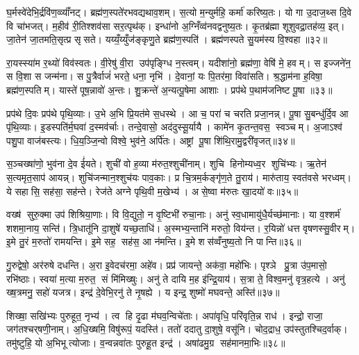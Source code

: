 घ॒र्मस्वे॑देभि॒र्द्रवि॑ण॒व्व्याँ॑नट्। ब्रह्म॑ण॒स्पते॑रभवद्यथाव॒शम्। स॒त्यो म॒न्युर्महि॒ कर्मा॑ करिष्य॒तः। यो गा उ॒दाज॒थ्स दि॒वे वि चा॑भजत्। म॒हीव॑ री॒तिश्शव॑सा सर॒त्पृथ॑क्। इन्धा॑नो अ॒ग्निँव्व॑नवद्वनुष्य॒तः। कृ॒तब्र॑ह्मा शूशुवद्रा॒तह॑व्य॒ इत्। जा॒तेन॑ जा॒तमति॒सृत्प्र सृसते। यय्यँ॒य्युँज॑ङ्कृणु॒ते ब्रह्म॑ण॒स्पति॑। ब्रह्म॑णस्पते सु॒यम॑स्य वि॒श्वहा॥३२॥

रा॒यस्स्या॑म र॒थ्यो॑ विव॑स्वतः। वी॒रेषु॑ वी॒रा उप॑पृङ्ग्धि न॒स्त्वम्। यदीशा॑नो॒ ब्रह्म॑णा॒ वेषि॑ मे॒ हवम्। स इज्जने॑न॒ स वि॒शा स जन्म॑ना। स पु॒त्रैर्वाजं॑ भरते॒ धना॒ नृभि॑। दे॒वानां॒ यः पि॒तर॑मा॒ विवा॑सति। श्र॒द्धाम॑ना ह॒विषा॒ ब्रह्म॑ण॒स्पतिम्। यास्ते॑ पूष॒न्नावो॑ अ॒न्तः। शु॒क्रन्ते॑ अ॒न्यत्पू॒षेमा आशाः। प्रप॑थे प॒थाम॑जनिष्ट पू॒षा ॥३३॥

प्रप॑थे दि॒वः प्रप॑थे पृथि॒व्याः। उ॒भे अ॒भि प्रि॒यत॑मे स॒धस्थे। आ च॒ परा॑ च चरति प्रजा॒नन्न्। पू॒षा सु॒बन्धु॑र्दि॒व आ पृ॑थि॒व्याः। इ॒डस्पति॑र्म॒घवा॑ द॒स्मव॑र्चाः। तन्दे॒वासो॒ अद॑दुस्सू॒र्यायै। कामे॑न कृ॒तन्त॒वस॒ स्वञ्चम्। अ॒जाऽश्व॑ पशु॒पा वाज॑बस्त्यः। धि॒य॒ञ्जि॒न्वो विश्वे॒ भुव॑ने॒ अर्पि॑तः। अष्ट्रां पू॒षा शि॑थि॒रामु॒द्वरी॑वृजत्॥३४॥

स॒ञ्चख्षा॑णो॒ भुव॑ना दे॒व ई॑यते। शुची॑ वो ह॒व्या म॑रुत॒श्शुची॑नाम्। शुचि हिनोम्यध्व॒र शुचि॑भ्यः। ऋ॒तेन॑ स॒त्यमृत॒साप॑ आयन्न्। शुचि॑जन्मान॒श्शुच॑यः पाव॒काः। प्र चि॒त्रम॒र्कङ्गृ॑ण॒ते तु॒राय॑। मारु॑ताय॒ स्वत॑वसे भरध्वम्। ये सहासि॒ सह॑सा॒ सह॑न्ते। रेज॑ते अग्ने पृथि॒वी म॒खेभ्य॑। असे॒ष्वा म॑रुतः खा॒दयो॑ वः॥३५॥

वख्ष॑ सुरु॒क्मा उप॑ शिश्रिया॒णाः। वि वि॒द्युतो॒ न वृ॒ष्टिभी॑ रुचा॒नाः। अनु॑ स्व॒धामायु॑धै॒र्यच्छ॑मानाः। या व॒श्शर्म॑ शशमा॒नाय॒ सन्ति॑। त्रि॒धातू॑नि दा॒शुषे॑ यच्छ॒ताधि॑। अ॒स्मभ्य॒न्तानि॑ मरुतो॒ विय॑न्त। र॒यिन्नो॑ धत्त वृषणस्सु॒वीरम्। इ॒मे तु॒रं म॒रुतो॑ रामयन्ति। इ॒मे सह॒ सह॑स॒ आ न॑मन्ति। इ॒मे शस॑व्वँनुष्य॒तो नि पान्ति॥३६॥

गु॒रुद्वेषो॒ अर॑रुषे दधन्ति। अ॒रा इ॒वेदच॑रमा॒ अहे॑व। प्रप्र॑ जायन्ते॒ अक॑वा॒ महो॑भिः। पृश्ञे प्रु॒त्रा उ॑प॒मासो॒ रभि॑ष्ठाः। स्वया॑ म॒त्या म॒रुत॒ सं मि॑मिख्षुः। अनु॑ ते दायि म॒ह इ॑न्द्रि॒याय॑। स॒त्रा ते॒ विश्व॒मनु॑ वृत्र॒हत्ये। अनु॑ ख्ष॒त्रमनु॒ सहो॑ यजत्र। इन्द्र॑ दे॒वेभि॒रनु॑ ते नृ॒षह्ये। य इन्द्र॒ शुष्मो॑ मघवन्ते॒ अस्ति॑॥३७॥

शिख्षा॒ सखि॑भ्यः पुरुहूत॒ नृभ्य॑। त्व हि दृ॒ढा म॑घव॒न्विचे॑ताः। अपा॑वृधि॒ परि॑वृति॒न्न राध॑। इन्द्रो॒ राजा॒ जग॑तश्चर्‌षणी॒नाम्। अ॒धि॒ख्षमि॒ विषु॑रूपं॒ यदस्ति॑। ततो॑ ददातु दा॒शुषे॒ वसू॑नि। चोद॒द्राध॒ उप॑स्तुतश्चिद॒र्वाक्। तमु॑ष्टुहि॒ यो अ॒भिभूत्योजाः। व॒न्वन्नवा॑तः पुरुहू॒त इन्द्र॑। अषा॑ढमु॒ग्र सह॑मानमा॒भिः॥३८॥

